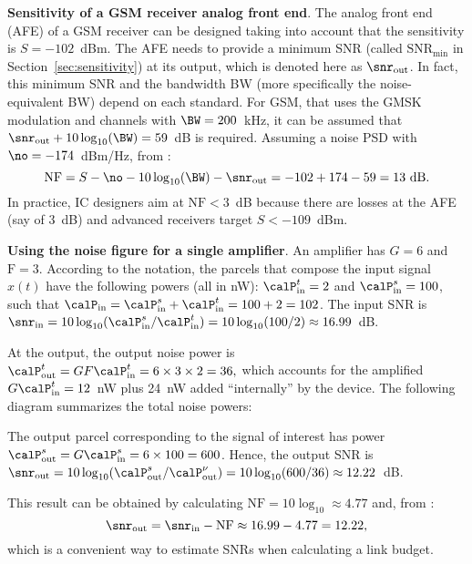 \bExample \textbf{Sensitivity of a GSM receiver analog front end}.
The analog front end (AFE) of a GSM receiver can be designed taking into account
that the sensitivity is $S = -102$~dBm. 
The AFE needs to provide a minimum SNR (called $\textrm{SNR}_{\textrm{min}}$ in Section~\ref{sec:sensitivity}) at its output, which is denoted here as $\snr_{\textrm{out}}$. In fact,
this minimum SNR and the bandwidth BW (more specifically the noise-equivalent BW) 
depend on each standard. For GSM, that uses the GMSK modulation and channels with
$\BW=200$~kHz, it can be assumed that $\snr_{\textrm{out}} + 10\log_{10}(\BW) = 59$~dB
is required. Assuming a noise PSD with $\no = -174$~dBm/Hz, from :
\[
\textrm{NF} = S -\no - 10\log_{10}(\BW) - \snr_{\textrm{out}} = -102 + 174 - 59 = 13~\textrm{dB}.
\]
In practice, IC designers aim at $\textrm{NF} < 3$~dB because there 
are losses at the AFE (say of 3~dB) and 
advanced receivers target $S < -109$~dBm.
\eExample 

\bExample \textbf{Using the noise figure for a single amplifier}.
\label{ex:singleAmpNF}
An amplifier has $G=6$ and $\textrm{F}=3$. According to the notation, the parcels that compose the input signal $x(t)$ have the following powers (all in nW): 
$\calP_{\textrm{in}}^{t}=2$ and $\calP_{\textrm{in}}^{s}=100$, such that $\calP_{\textrm{in}}= \calP_{\textrm{in}}^{s} + \calP_{\textrm{in}}^{t}= 100+2=102$. The input SNR is
$\snr_{\textrm{in}}=10 \log_{10} (\calP_{\textrm{in}}^{s}/\calP_{\textrm{in}}^{t})= 10 \log_{10}(100/2) \approx 16.99$~dB. 

At the output, the output noise power is
$
\calP_{\textrm{out}}^{t} = G F \calP_{\textrm{in}}^{t} = 6 \times 3 \times 2 = 36,
$
which accounts for the amplified $G \calP_{\textrm{in}}^{t} = 12$~nW plus 24~nW added ``internally'' by the device.
The following diagram summarizes the total noise powers:


The output parcel corresponding to the signal of interest has power
$\calP_{\textrm{out}}^{s} = G \calP_{\textrm{in}}^{s} = 6 \times 100 = 600$. Hence, the output SNR is $\snr_{\textrm{out}} = 10 \log_{10} (\calP_{\textrm{out}}^{s} / \calP_{\textrm{out}}^{\nu}) = 10 \log_{10} (600/36) \approx 12.22$~dB.

This result can be obtained by calculating $\textrm{NF}= 10 \log_{10} \approx 4.77$ and, from :
\[
\snr_{\textrm{out}} = \snr_{\textrm{in}} - \textrm{NF} \approx 16.99 - 4.77 = 12.22,
\]
which is a convenient way to estimate SNRs when calculating a link budget.
\eExample

